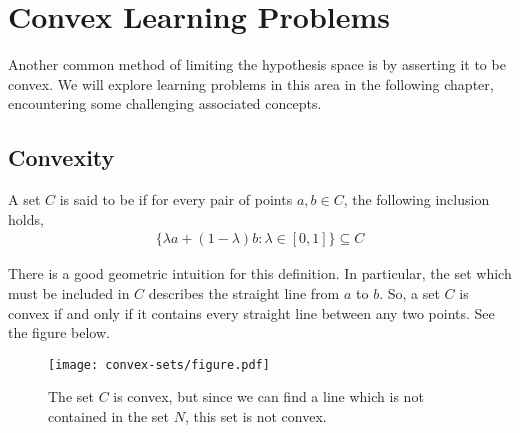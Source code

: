 \chapter{Convex Learning Problems}

\begin{chout}
	Another common method of limiting the hypothesis space is by asserting it to be convex. We will explore learning problems in this area in the following chapter, encountering some challenging associated concepts.
\end{chout}

\section{Convexity}

\begin{definition}
	A set $ C $ is said to be  if for every pair of points $ a,b \in C $, the following inclusion holds,
	\begin{align*}
		\{ \lambda a + (1- \lambda) b: \lambda \in [ 0,1 ] \} \subseteq C
	\end{align*}
\end{definition}

There is a good geometric intuition for this definition. In particular, the set which must be included in $ C $ describes the straight line from $ a $ to $ b $. So, a set $ C $ is convex if and only if it contains every straight line between any two points. See the figure below.

\begin{figure}[!htb]
	\centering
	\texttt{[image: convex-sets/figure.pdf]}
	\caption{The set $ C $ is convex, but since we can find a line which is not contained in the set $ N $, this set is not convex.}
\end{figure}
